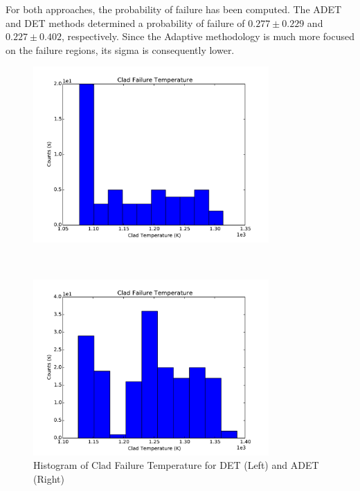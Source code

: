 For both approaches, the probability of failure has been computed. The ADET and DET methods determined a probability of failure of $0.277 \pm 0.229$ and $0.227\pm 0.402$, respectively. Since the Adaptive methodology is much more focused on the failure regions, its sigma is consequently lower.
\begin{figure}[h]
 \begin{minipage}[b]{8.5cm}
   \centering
   \includegraphics[width=9cm]{figures/HistogramSampledVarCladFailureDET_histogram.pdf}
 \end{minipage}
 \ \hspace{2mm} \hspace{3mm} \
 \begin{minipage}[b]{8.5cm}
   \centering
   \includegraphics[width=9cm]{figures/HistogramSampledVarCladFailureADET_histogram.pdf}
 \end{minipage}
\caption{Histogram of Clad Failure Temperature for DET (Left) and ADET (Right)}
\label{fig:SampledTEMP}
\end{figure}

